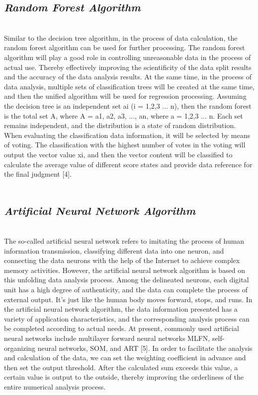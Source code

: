 \documentclass{article}
\begin{document}
\subsection{\emph{Random Forest Algorithm}}\\
Similar to the decision tree algorithm, in the process of data calculation, the random forest algorithm 
can be used for further processing. The random forest algorithm will play a good role in controlling 
unreasonable data in the process of actual use. Thereby effectively improving the scientificity of the 
data split results and the accuracy of the data analysis results. At the same time, in the process of data 
analysis, multiple sets of classification trees will be created at the same time, and then the unified 
algorithm will be used for regression processing. Assuming the decision tree is an independent set ai (i 
= 1,2,3 ... n), then the random forest is the total set A, where A = {a1, a2, a3, ..., an}, where a = 1,2,3 ... 
n. Each set remains independent, and the distribution is a state of random distribution. When 
evaluating the classification data information, it will be selected by means of voting. The classification 
with the highest number of votes in the voting will output the vector value xi, and then the vector 
content will be classified to calculate the average value of different score states and provide data 
reference for the final judgment [4].
\\\\
\subsection{\emph{ Artificial Neural Network Algorithm}}\\
The so-called artificial neural network refers to imitating the process of human information 
transmission, classifying different data into one neuron, and connecting the data neurons with the help 
of the Internet to achieve complex memory activities. However, the artificial neural network algorithm 
is based on this unfolding data analysis process. Among the delineated neurons, each digital unit has a 
high degree of authenticity, and the data can complete the process of external output. It's just like the 
human body moves forward, stops, and runs. In the artificial neural network algorithm, the data 
information presented has a variety of application characteristics, and the corresponding analysis 
process can be completed according to actual needs. At present, commonly used artificial neural 
networks include multilayer forward neural networks MLFN, self-organizing neural networks, SOM, 
and ART [5]. In order to facilitate the analysis and calculation of the data, we can set the weighting 
coefficient in advance and then set the output threshold. After the calculated sum exceeds this value, a 
certain value is output to the outside, thereby improving the orderliness of the entire numerical 
analysis process.
\\\\
\end{document}
